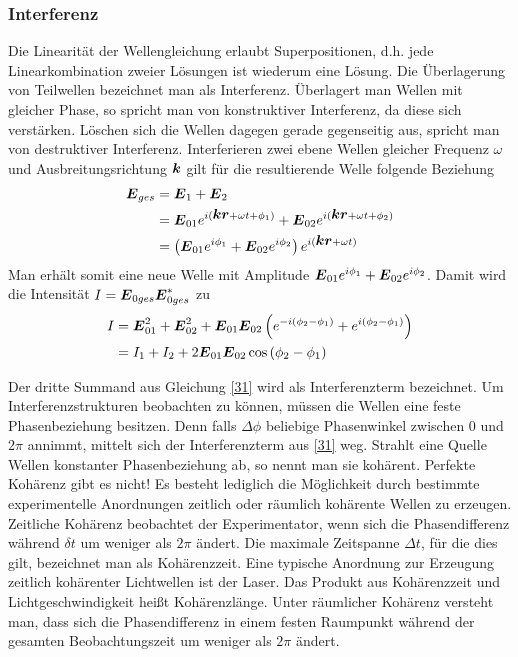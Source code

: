 \documentclass[12pt]{article}
\renewcommand*\vec[1]{{\mbox{\boldmath\ensuremath{#1}}}}
\begin{document}
\subsubsection{Interferenz}
Die Linearität der Wellengleichung erlaubt Superpositionen, d.h. jede Linearkombination zweier Lösungen ist wiederum eine Lösung. Die Überlagerung von Teilwellen bezeichnet man als Interferenz. Überlagert man Wellen mit gleicher Phase, so spricht man von
konstruktiver Interferenz, da diese sich verstärken. Löschen sich die Wellen dagegen gerade gegenseitig
aus, spricht man von destruktiver Interferenz.
Interferieren zwei ebene Wellen gleicher Frequenz $\omega$ und Ausbreitungsrichtung $\vec k$ gilt für die
resultierende Welle folgende Beziehung
\begin{align}
 \vec E_{ges} &= \vec E_1 + \vec E_2 \\
&= \vec E_{01} e^{i(\vec k \vec r + \omega t + \phi_1)} + \vec E_{02} e^{i(\vec k \vec r + \omega t + \phi_2)} \\
&= \left( \vec E_{01} e^{i\phi_1} + \vec E_{02} e^{i\phi_2} \right) e^{i(\vec k \vec r + \omega t)}
\end{align}
Man erhält somit eine neue Welle mit Amplitude $\vec E_{01} e^{i\phi_1} + \vec E_{02} e^{i\phi_2}$. Damit wird die
Intensität $I= \vec E_{0ges}\vec E^*_{0ges}$ zu
\begin{align}
 I &= \vec E^2_{01} + \vec E^2_{02} + \vec E_{01}\vec E_{02} \left( e^{-i(\phi_2 - \phi_1)} + e^{i(\phi_2 - \phi_1)}\right) \\
\label{31} &= I_1 + I_2 + 2\vec E_{01}\vec E_{02} \cos{(\phi_2 - \phi_1)}
\end{align}

Der dritte Summand aus Gleichung \ref{31} wird als Interferenzterm bezeichnet.
Um Interferenzstrukturen beobachten zu können, müssen die Wellen eine feste Phasenbeziehung besitzen.
Denn falls $\Delta\phi$ beliebige Phasenwinkel zwischen $0$ und $2\pi$ annimmt, mittelt sich der
Interferenzterm aus \ref{31} weg. Strahlt eine Quelle Wellen konstanter Phasenbeziehung ab, so
nennt man sie kohärent. Perfekte Kohärenz gibt es nicht! Es besteht
lediglich die Möglichkeit durch bestimmte experimentelle Anordnungen zeitlich oder räumlich
kohärente Wellen zu erzeugen.
Zeitliche Kohärenz beobachtet der Experimentator, wenn sich die Phasendifferenz während $\delta t$
um weniger als $2\pi$ ändert. Die maximale Zeitspanne $\Delta t$, für die dies gilt, bezeichnet man als
Kohärenzzeit. Eine typische Anordnung zur Erzeugung zeitlich kohärenter Lichtwellen ist der
Laser. Das Produkt aus Kohärenzzeit und Lichtgeschwindigkeit heißt Kohärenzlänge.
Unter räumlicher Kohärenz versteht man, dass sich die Phasendifferenz in einem festen Raumpunkt während der
gesamten Beobachtungszeit um weniger als $2\pi$ ändert. 
\end{document}

